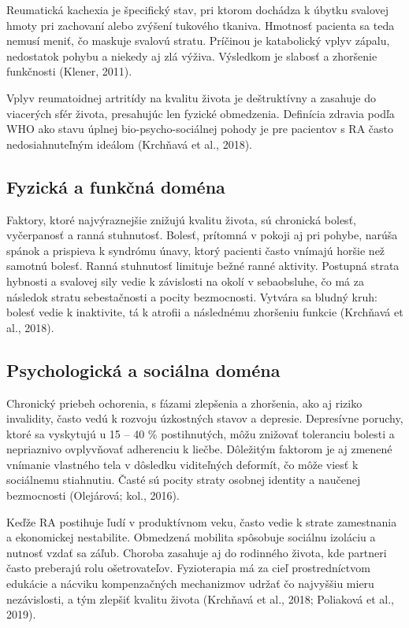 Reumatická kachexia je špecifický stav, pri ktorom dochádza k úbytku svalovej hmoty pri zachovaní alebo zvýšení tukového tkaniva. Hmotnosť pacienta sa teda nemusí meniť, čo maskuje svalovú stratu. Príčinou je katabolický vplyv zápalu, nedostatok pohybu a niekedy aj zlá výživa. Výsledkom je slabosť a zhoršenie funkčnosti (Klener, 2011). 

Vplyv reumatoidnej artritídy na kvalitu života je deštruktívny a zasahuje do viacerých sfér života, presahujúc len fyzické obmedzenia. Definícia zdravia podľa WHO ako stavu úplnej bio-psycho-sociálnej pohody je pre pacientov s RA často nedosiahnuteľným ideálom (Krchňavá et al., 2018). 

\subsection{Fyzická a funkčná doména}

Faktory, ktoré najvýraznejšie znižujú kvalitu života, sú chronická bolesť, vyčerpanosť a ranná stuhnutosť. Bolesť, prítomná v pokoji aj pri pohybe, narúša spánok a prispieva k syndrómu únavy, ktorý pacienti často vnímajú horšie než samotnú bolesť. Ranná stuhnutosť limituje bežné ranné aktivity. Postupná strata hybnosti a svalovej sily vedie k závislosti na okolí v sebaobsluhe, čo má za následok stratu sebestačnosti a pocity bezmocnosti. Vytvára sa bludný kruh: bolesť vedie k inaktivite, tá k atrofii a následnému zhoršeniu funkcie (Krchňavá et al., 2018). 

\subsection{Psychologická a sociálna doména}

Chronický priebeh ochorenia, s fázami zlepšenia a zhoršenia, ako aj riziko invalidity, často vedú k rozvoju úzkostných stavov a depresie. Depresívne poruchy, ktoré sa vyskytujú u 15 – 40 \% postihnutých, môžu znižovať toleranciu bolesti a nepriaznivo ovplyvňovať adherenciu k liečbe. Dôležitým faktorom je aj zmenené vnímanie vlastného tela v dôsledku viditeľných deformít, čo môže viesť k sociálnemu stiahnutiu. Časté sú pocity straty osobnej identity a naučenej bezmocnosti (Olejárová; kol., 2016). 

Keďže RA postihuje ľudí v produktívnom veku, často vedie k strate zamestnania a ekonomickej nestabilite. Obmedzená mobilita spôsobuje sociálnu izoláciu a nutnosť vzdať sa záľub. Choroba zasahuje aj do rodinného života, kde partneri často preberajú rolu ošetrovateľov. Fyzioterapia má za cieľ prostredníctvom edukácie a nácviku kompenzačných mechanizmov udržať čo najvyššiu mieru nezávislosti, a tým zlepšiť kvalitu života (Krchňavá et al., 2018; Poliaková et al., 2019). 


